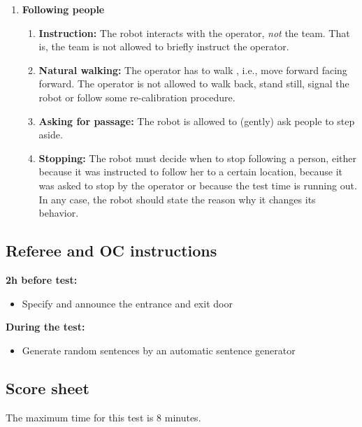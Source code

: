 \begin{enumerate}
\begin{enumerate}
	\end{enumerate}
	\item \textbf{Following people} 
	\begin{enumerate}
		\item \textbf{Instruction:} The robot interacts with the operator, \emph{not} the team. That is, the team is not allowed to briefly instruct the operator.
		\item \textbf{Natural walking:} The operator has to walk , i.e., move forward facing forward. The operator is not allowed to walk back, stand still, signal the robot or follow some re-calibration procedure.
		\item \textbf{Asking for passage:} The robot is allowed to (gently) ask people to step aside.
		\item \textbf{Stopping:} The robot must decide when to stop following a person, either because it was instructed to follow her to a certain location, because it was asked to stop by the operator or because the test time is running out. In any case, the robot should state the reason why it changes its behavior.
	\end{enumerate}
\end{enumerate}

\subsection{Referee and OC instructions}
\textbf{2h before test:}
\begin{itemize}
\item Specify and announce the entrance and exit door
\end{itemize}
\textbf{During the test:}
\begin{itemize}
\item Generate random sentences by an automatic sentence generator
\end{itemize}

\newpage
\subsection{Score sheet}
The maximum time for this test is 8 minutes.


